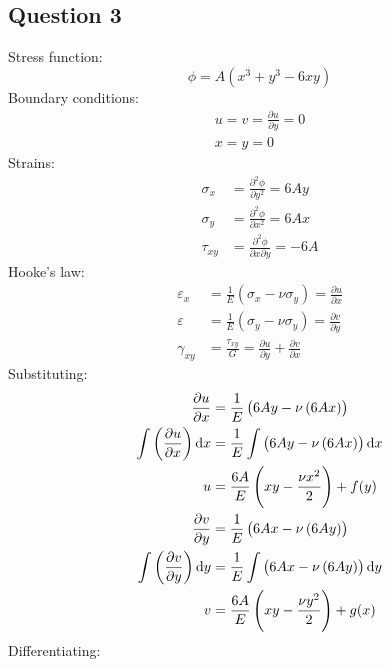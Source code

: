 \documentclass[11pt]{article}
\numberwithin{equation}{section}
\begin{document}
\subsection{Question 3}
Stress function:
\begin{equation}
    \phi = A \left(x^3 + y^3 -6xy\right)
\end{equation}
Boundary conditions:
\begin{align}
    u = v = \frac{\partial u}{\partial y} = 0 \\
    x = y = 0
\end{align}
Strains:
\begin{align}
    \sigma_x  & = \frac{\partial^2 \phi}{\partial y^2} = 6Ay          \\
    \sigma_y  & = \frac{\partial^2 \phi}{\partial x^2} = 6Ax          \\
    \tau_{xy} & = \frac{\partial^2 \phi}{\partial x \partial y} = -6A
\end{align}
Hooke's law:
\begin{align}
    \varepsilon_x & = \frac{1}{E}\left(\sigma_x - \nu \sigma_y\right) = \frac{\partial u}{\partial x}     \\
    \varepsilon   & = \frac{1}{E}\left(\sigma_y - \nu \sigma_y\right) = \frac{\partial v}{\partial y}     \\
    \gamma_{xy}   & = \frac{\tau_{xy}}{G} = \frac{\partial u}{\partial y} + \frac{\partial v}{\partial x}
\end{align}
Substituting:
\begin{align}
    \frac{\partial u}{\partial x}                         & = \frac{1}{E}\left(6Ay - \nu \left(6Ax\right)\right)           \\
    \int\left(\frac{\partial u}{\partial x} \right)\dif x & = \frac{1}{E}\int\left(6Ay - \nu \left(6Ax\right)\right)\dif x \\
    u                                                     & = \frac{6A}{E}\left(xy - \frac{\nu x^2}{2}\right) + f(y)       \\
    \frac{\partial v}{\partial y}                         & = \frac{1}{E} \left(6Ax - \nu \left(6Ay\right)\right)          \\
    \int\left(\frac{\partial v}{\partial y}\right)\dif y  & = \frac{1}{E}\int\left(6Ax - \nu\left(6Ay\right)\right)\dif y  \\
    v                                                     & = \frac{6A}{E}\left(xy - \frac{\nu y^2}{2}\right) + g(x)
\end{align}
Differentiating:
\end{document}
